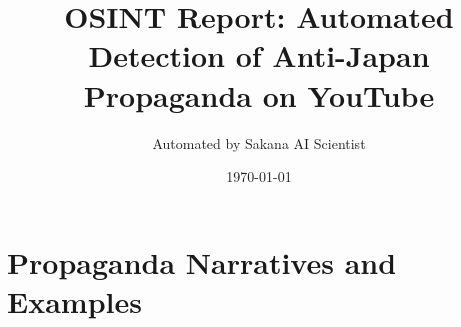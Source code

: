 \documentclass{article}
\title{OSINT Report: Automated Detection of Anti-Japan Propaganda on YouTube}
\author{Automated by Sakana AI Scientist}
\date{\today}
\begin{document}
\maketitle

\section*{Propaganda Narratives and Examples}
\end{document}
